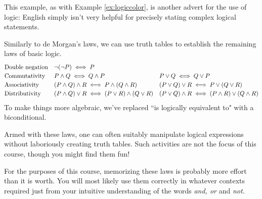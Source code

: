 This example, as with Example \ref{ex:logiccolor}, is another advert for the use of logic: English simply isn't very helpful for precisely stating complex logical statements.


\begin{aside}{}{}

Similarly to de Morgan's laws, we can use truth tables to establish the remaining laws of basic logic.
\[
	\def\arraystretch{1.2}
	\begin{array}{@{}lll@{}}
	\text{Double negation} & \neg(\neg P)\iff P &\\
	\text{Commutativity} & P\wedge Q\iff Q\wedge P & P\vee Q\iff Q\vee P\\
	\text{Associativity} & (P\wedge Q)\wedge R\iff P\wedge(Q\wedge R) & (P\vee Q)\vee R\iff P\vee(Q\vee R)\\
	\text{Distributivity}&(P\wedge Q)\vee R\iff (P\vee R)\wedge (Q\vee R) & (P\vee Q)\wedge R\iff (P\wedge R)\vee (Q\wedge R)
	\end{array}
\]
To make things more algebraic, we've replaced ``is logically equivalent to" with a biconditional.\footnotemark{}\smallbreak

Armed with these laws, one can often suitably manipulate logical expressions without laboriously creating truth tables. Such activities are not the focus of this course, though you might find them fun!\smallbreak

For the purposes of this course, memorizing these laws is probably more effort than it is worth. You will most likely use them correctly in whatever contexts required just from your intuitive understanding of the words \emph{and, or} and \emph{not.}
\end{aside}


\goodbreak

